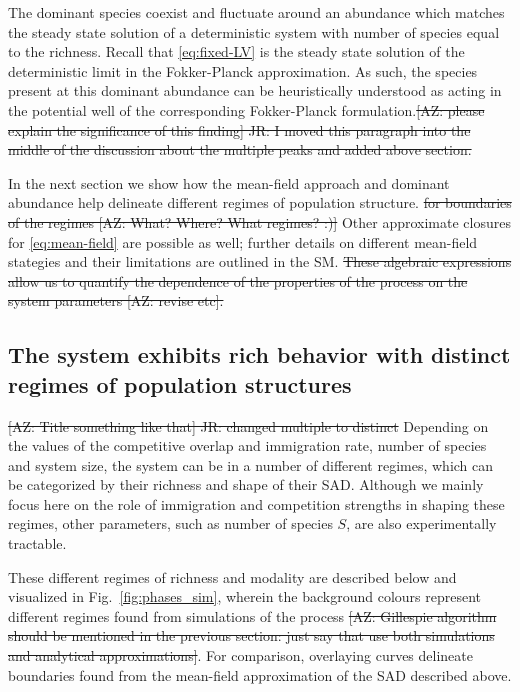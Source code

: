 \documentclass[9pt,twocolumn,twoside,lineno]{pnas-new}
\begin{document}
The dominant species coexist and fluctuate around an abundance which matches the steady state solution of a deterministic system with number of species equal to the richness.
Recall that \eqref{eq:fixed-LV} is the steady state solution of the deterministic limit in the Fokker-Planck approximation.
As such, the species present at this dominant abundance can be heuristically understood as acting in the potential well of the corresponding Fokker-Planck formulation.\st{[AZ: please explain the significance of this finding] JR: I moved this paragraph into the middle of the discussion about the multiple peaks and added above section.}

In the next section we show how the mean-field approach and dominant abundance help delineate different regimes of population structure. \st{for boundaries of the regimes [AZ: What? Where? What regimes? :)]}
Other approximate closures for \eqref{eq:mean-field} are possible as well; further details on different mean-field stategies and their limitations are outlined in the SM.
\st{These algebraic expressions allow us to quantify the dependence of the properties of the process on the system parameters [AZ: revise etc].}

\subsection{The system exhibits rich behavior with distinct regimes of population structures } 
\label{sec:Phases}
\st{[AZ: Title something like that] JR: changed multiple to distinct} 
Depending on the values of the competitive overlap and immigration rate, number of species and system size, the system can be in a number of different regimes, which can be categorized by their richness and shape of their SAD.
Although we mainly focus here on the role of immigration and competition strengths in shaping these regimes, other parameters, such as number of species $S$, are also experimentally tractable.

These different regimes of richness and modality are described below and visualized in Fig.~\ref{fig:phases_sim}, wherein the background colours represent different regimes found from simulations of the process \st{[AZ: Gillespie algorithm should be mentioned in the previous section: just say that use both simulations and analytical approximations]}.
For comparison, overlaying curves delineate boundaries found from the mean-field approximation of the SAD described above.
\end{document}
